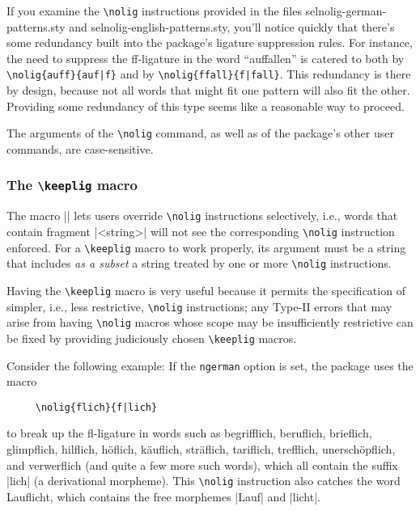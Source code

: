 \documentclass[11pt]{article}
\newcommand{\pkg}[1]{\textsf{#1}}
\newcommand{\opt}[1]{\texttt{#1}}
\newcommand{\cmmd}[1]{\texttt{\textbackslash #1}}
\begin{document}
If you examine the \cmmd{nolig} instructions provided in the files \pkg{selnolig-german-patterns.sty} and \pkg{selnolig-english-patterns.sty}, you'll notice quickly that there's some redundancy built into the package's ligature suppression rules. For instance, the need to suppress the ff-ligature in the word \enquote{auffallen} is catered to both by \Verb+\nolig{auff}{auf|f}+ and by \Verb+\nolig{ffall}{f|fall}+. This redundancy is there by design, because not all words that might fit one pattern will also fit the other. Providing some redundancy of this type seems like a reasonable way to proceed.

The arguments of the \cmmd{nolig} command, as well as of the package's other user commands, are case-sensitive. 

\subsubsection{The \cmmd{keeplig} macro} 
\label{sec:keeplig}


The macro || lets users override \cmmd{nolig} instructions selectively, i.e., words that contain fragment |<string>| will not see the corresponding \cmmd{nolig} instruction enforced. For a \cmmd{keeplig} macro to work properly, its argument must be a string that includes \emph{as a subset} a string treated by one or more \cmmd{nolig} instructions.

Having the \cmmd{keeplig} macro is very useful because it permits the specification of simpler, i.e., less restrictive, \cmmd{nolig} instructions; any Type-II errors that may arise from having \cmmd{nolig} macros whose scope may be insufficiently restrictive can be fixed by providing judiciously chosen \cmmd{keeplig} macros.

Consider the following example: If the \opt{ngerman} option is set, the package uses the macro 
\begin{Verbatim}
     \nolig{flich}{f|lich}
\end{Verbatim}
to break up the fl-ligature in words such as begrifflich, beruflich, brieflich, glimpflich, hilflich, höflich, käuflich, sträflich, tariflich, trefflich, unerschöpflich, and verwerflich (and quite a few more such words), which all contain the suffix |lich| (a derivational morpheme). This \cmmd{nolig} instruction also catches the word Lauflicht, which contains the free morphemes |Lauf| and |licht|. 
\end{document}
